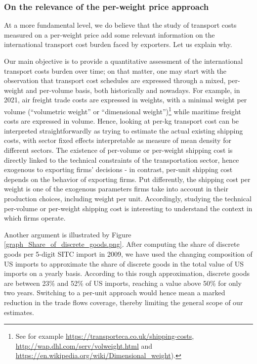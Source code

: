 \documentclass[a4paper,11pt]{article}
\begin{document}
\subsubsection{On the relevance of the per-weight price approach}
At a more fundamental level, we do believe that the study of transport costs measured on a per-weight price add some relevant information on the international transport cost burden faced by exporters. Let us explain why.

Our main objective is to provide a quantitative assessment of the international transport costs burden over time; on that matter, one may start with the observation that transport cost schedules are expressed through a mixed, per-weight and per-volume basis, both historically and nowadays. For example, in 2021, air freight trade costs are expressed in weights, with a minimal weight per volume (``volumetric weight'' or ``dimensional weight'')\footnote{See for example \href{https://transporteca.co.uk/shipping-costs}{https://transporteca.co.uk/shipping-costs}, \href{http://wap.dhl.com/serv/volweight.html}{http://wap.dhl.com/serv/volweight.html} and \href{https://en.wikipedia.org/wiki/Dimensional_weight}{ https://en.wikipedia.org/wiki/Dimensional\_weight}).} while maritime freight costs are expressed in volume.
Hence, looking at per-kg transport cost can be interpreted straightforwardly as trying to estimate the actual existing shipping costs, with sector fixed effects interpretable as measure of mean density for different sectors. The existence of per-volume or per-weight shipping cost is directly linked to the technical constraints of the transportation sector, hence exogenous to exporting firms' decisions - in contrast, per-unit shipping cost depends on the behavior of exporting firms. Put differently, the shipping cost per weight is one of the exogenous parameters firms take into account in their production choices, including weight per unit. Accordingly, studying the technical per-volume or per-weight shipping cost is interesting to understand the context in which firms operate.

Another argument is illustrated by Figure \ref{graph_Share_of_discrete_goods.png}. After computing the share of discrete goods per 5-digit SITC import in 2009, we have used the changing composition of US imports to approximate the share of discrete goods in the total value of US imports on a yearly basis. According to this rough approximation, discrete goods are between 23\% and 52\% of US imports, reaching a value above 50\% for only two years. Switching to a per-unit approach would hence mean a marked reduction in the trade flows coverage, thereby limiting the general scope of our estimates.
\end{document}
